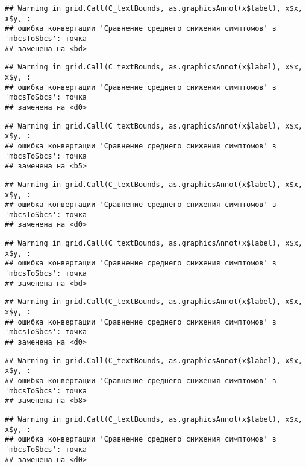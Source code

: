 \documentclass[
]{article}
\begin{document}
\begin{verbatim}
## Warning in grid.Call(C_textBounds, as.graphicsAnnot(x$label), x$x, x$y, :
## ошибка конвертации 'Сравнение среднего снижения симптомов' в 'mbcsToSbcs': точка
## заменена на <bd>
\end{verbatim}

\begin{verbatim}
## Warning in grid.Call(C_textBounds, as.graphicsAnnot(x$label), x$x, x$y, :
## ошибка конвертации 'Сравнение среднего снижения симптомов' в 'mbcsToSbcs': точка
## заменена на <d0>
\end{verbatim}

\begin{verbatim}
## Warning in grid.Call(C_textBounds, as.graphicsAnnot(x$label), x$x, x$y, :
## ошибка конвертации 'Сравнение среднего снижения симптомов' в 'mbcsToSbcs': точка
## заменена на <b5>
\end{verbatim}

\begin{verbatim}
## Warning in grid.Call(C_textBounds, as.graphicsAnnot(x$label), x$x, x$y, :
## ошибка конвертации 'Сравнение среднего снижения симптомов' в 'mbcsToSbcs': точка
## заменена на <d0>
\end{verbatim}

\begin{verbatim}
## Warning in grid.Call(C_textBounds, as.graphicsAnnot(x$label), x$x, x$y, :
## ошибка конвертации 'Сравнение среднего снижения симптомов' в 'mbcsToSbcs': точка
## заменена на <bd>
\end{verbatim}

\begin{verbatim}
## Warning in grid.Call(C_textBounds, as.graphicsAnnot(x$label), x$x, x$y, :
## ошибка конвертации 'Сравнение среднего снижения симптомов' в 'mbcsToSbcs': точка
## заменена на <d0>
\end{verbatim}

\begin{verbatim}
## Warning in grid.Call(C_textBounds, as.graphicsAnnot(x$label), x$x, x$y, :
## ошибка конвертации 'Сравнение среднего снижения симптомов' в 'mbcsToSbcs': точка
## заменена на <b8>
\end{verbatim}

\begin{verbatim}
## Warning in grid.Call(C_textBounds, as.graphicsAnnot(x$label), x$x, x$y, :
## ошибка конвертации 'Сравнение среднего снижения симптомов' в 'mbcsToSbcs': точка
## заменена на <d0>
\end{verbatim}
\end{document}
